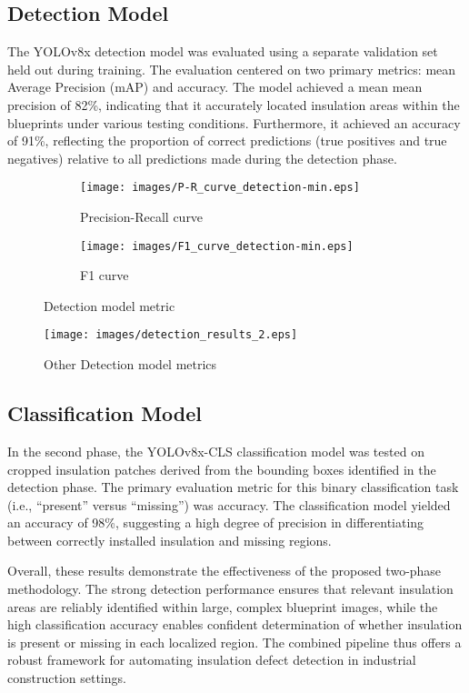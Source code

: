 \documentclass[]{IEEEphot}
\begin{document}
\subsection{Detection Model
}
The YOLOv8x detection model was evaluated using a separate validation set held out during training. The evaluation centered on two primary metrics: mean Average Precision (mAP) and accuracy. The model achieved a mean mean precision of 82\%, indicating that it accurately located insulation areas within the blueprints under various testing conditions. Furthermore, it achieved an accuracy of 91\%, reflecting the proportion of correct predictions (true positives and true negatives) relative to all predictions made during the detection phase.
\begin{figure}[htbp]
\centering
\begin{subfigure}[b]{0.45\textwidth}
\centering
\texttt{[image: images/P-R\_curve\_detection-min.eps]} %
\caption{Precision-Recall curve}
\label{fig:sub1}
\end{subfigure}
\hfill
\begin{subfigure}[b]{0.45\textwidth}
\centering
\texttt{[image: images/F1\_curve\_detection-min.eps]} %
\caption{F1 curve }
\label{fig:sub2}
\end{subfigure}

\caption{Detection model metric}
\label{fig:two_images}
\end{figure}
\begin{figure}[h]
    \centering
    \texttt{[image: images/detection\_results\_2.eps]}
    \caption{ Other Detection model metrics}
    \label{fig:enter-label}
\end{figure}
\subsection{Classification Model
}
In the second phase, the YOLOv8x-CLS classification model was tested on cropped insulation patches derived from the bounding boxes identified in the detection phase. The primary evaluation metric for this binary classification task (i.e., “present” versus “missing”) was accuracy. The classification model yielded an accuracy of 98\%, suggesting a high degree of precision in differentiating between correctly installed insulation and missing regions.

Overall, these results demonstrate the effectiveness of the proposed two-phase methodology. The strong detection performance ensures that relevant insulation areas are reliably identified within large, complex blueprint images, while the high classification accuracy enables confident determination of whether insulation is present or missing in each localized region. The combined pipeline thus offers a robust framework for automating insulation defect detection in industrial construction settings.
\end{document}
